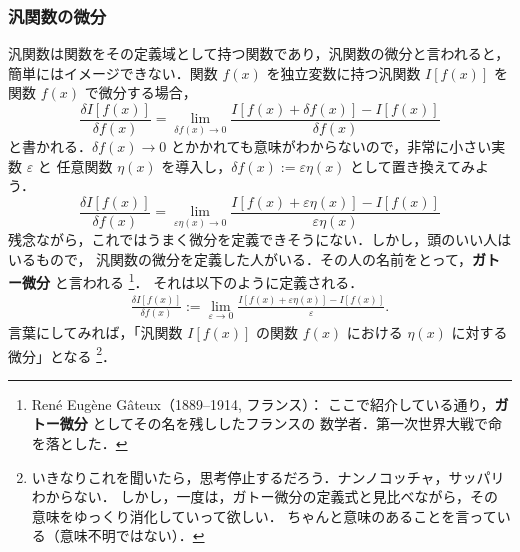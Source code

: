             \subsubsection{汎関数の微分}
                汎関数は関数をその定義域として持つ関数であり，汎関数の微分と言われると，
                簡単にはイメージできない．関数 $f(x)$ を独立変数に持つ汎関数 $I[f(x)]$ を
                関数 $f(x)$ で微分する場合，
                    \begin{equation*}
                        \frac{\delta I[f(x)]}{\delta f(x)}
                        = \lim_{\delta f(x) \to 0}
                          \frac{I[f(x)+\delta f(x)] - I[f(x)]}{\delta f(x)}
                    \end{equation*}
                と書かれる．$\delta f(x) \to 0$ とかかれても意味がわからないので，非常に小さい実数 $\varepsilon$ と
                任意関数 $\eta(x)$ を導入し，$\delta f(x):= \varepsilon \eta(x)$ として置き換えてみよう．
                    \begin{equation*}
                        \frac{\delta I[f(x)]}{\delta f(x)}
                        = \lim_{\varepsilon \eta(x) \to 0}
                          \frac{I[f(x)+\varepsilon \eta(x)] - I[f(x)]}{\varepsilon \eta(x)}
                    \end{equation*}
                残念ながら，これではうまく微分を定義できそうにない．しかし，頭のいい人はいるもので，
                汎関数の微分を定義した人がいる．その人の名前をとって，\textbf{ガトー微分} と言われる
                    \footnote{
                        Ren\'{e} Eug\`{e}ne G\^{a}teux（1889--1914, フランス）：
                        ここで紹介している通り，\textbf{ガトー微分} としてその名を残ししたフランスの
                        数学者．第一次世界大戦で命を落とした．
                    }．
                それは以下のように定義される．
                    \begin{align}
                        \frac{\delta I[f(x)]}{\delta f(x)}
                        := \lim_{\varepsilon \to 0} \frac{I[f(x)+\varepsilon \eta(x)] - I[f(x)]}{\varepsilon}.
                    \end{align}
                言葉にしてみれば，「汎関数 $I[f(x)]$ の関数 $f(x)$ における $\eta(x)$ に対する微分」となる
                    \footnote{
                        いきなりこれを聞いたら，思考停止するだろう．ナンノコッチャ，サッパリわからない．
                        しかし，一度は，ガトー微分の定義式と見比べながら，その意味をゆっくり消化していって欲しい．
                        ちゃんと意味のあることを言っている（意味不明ではない）．
                    }．



